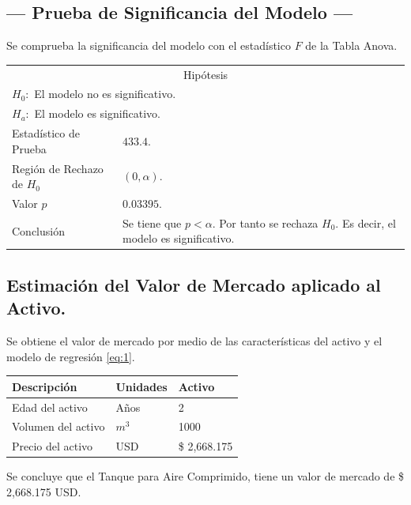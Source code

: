 \subsection{\centering --- Prueba de Significancia del Modelo ---} %
Se comprueba la significancia del modelo con el estadístico \(F\) de la Tabla Anova.
\begin{center}
  \begin{tabular}{|l|p{6cm}|}
    \cline{1-2}
    \multicolumn{2}{|c|}{Hipótesis}\\ \cline{1-2}
    \multicolumn{2}{|l|}{\(H_0:\) El modelo no es significativo.} \\ 
    \multicolumn{2}{|l|}{\(H_a:\) El modelo es significativo.} \\ \cline{1-2}
    Estadístico de Prueba & \(433.4\).\\ \cline{1-2} 
		Región de Rechazo de \(H_0\) & \((0, \alpha )\).\\ \cline{1-2} 
    Valor \(p\) & \(0.03395\).\\ \cline{1-2} 
    Conclusión & Se tiene que \(p<\alpha\). \newline 
		Por tanto se rechaza \(H_0\). \newline 
		Es decir, el modelo es significativo.\\ \cline{1-2} 
  \end{tabular}
\end{center} 

\subsection{\centering Estimación del Valor de Mercado aplicado al Activo.} %
Se obtiene el valor de mercado por medio de las características del activo y el modelo de regresión \eqref{eq:1}.
\begin{center}
  \begin{tabular}{|l|l|l|}
    \hline 
		Descripción   & Unidades  & Activo \\ \hline 
    Edad del activo    & Años      & 2      \\ \hline 
		Volumen del activo & \(m ^ 3\) & 1000   \\ \hline 
		Precio del activo   & USD       & \$ 2,668.175   \\ \hline 
  \end{tabular}
\end{center} 
Se concluye que el Tanque para Aire Comprimido, tiene un valor de mercado de 
\$ 2,668.175  USD.

